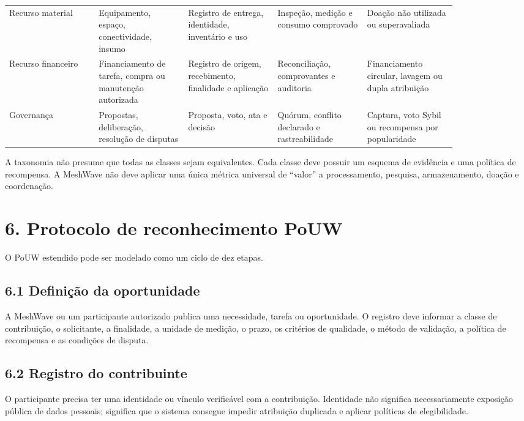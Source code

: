 \documentclass[12pt,a4paper]{article}
\begin{document}
\begin{center}
\begin{longtable}{p{0.17\linewidth} p{0.17\linewidth} p{0.17\linewidth} p{0.17\linewidth} p{0.17\linewidth}}
Recurso material & Equipamento, espaço, conectividade, insumo & Registro de entrega, identidade, inventário e uso & Inspeção, medição e consumo comprovado & Doação não utilizada ou superavaliada \\
Recurso financeiro & Financiamento de tarefa, compra ou manutenção autorizada & Registro de origem, recebimento, finalidade e aplicação & Reconciliação, comprovantes e auditoria & Financiamento circular, lavagem ou dupla atribuição \\
Governança & Propostas, deliberação, resolução de disputas & Proposta, voto, ata e decisão & Quórum, conflito declarado e rastreabilidade & Captura, voto Sybil ou recompensa por popularidade \\
\bottomrule
\end{longtable}
\end{center}

A taxonomia não presume que todas as classes sejam equivalentes. Cada classe deve possuir um esquema de evidência e uma política de recompensa. A MeshWave não deve aplicar uma única métrica universal de “valor” a processamento, pesquisa, armazenamento, doação e coordenação.\\


\section{6. Protocolo de reconhecimento PoUW}

O PoUW estendido pode ser modelado como um ciclo de dez etapas.\\

\subsection{6.1 Definição da oportunidade}

A MeshWave ou um participante autorizado publica uma necessidade, tarefa ou oportunidade. O registro deve informar a classe de contribuição, o solicitante, a finalidade, a unidade de medição, o prazo, os critérios de qualidade, o método de validação, a política de recompensa e as condições de disputa.\\

\subsection{6.2 Registro do contribuinte}

O participante precisa ter uma identidade ou vínculo verificável com a contribuição. Identidade não significa necessariamente exposição pública de dados pessoais; significa que o sistema consegue impedir atribuição duplicada e aplicar políticas de elegibilidade.\\
\end{document}
